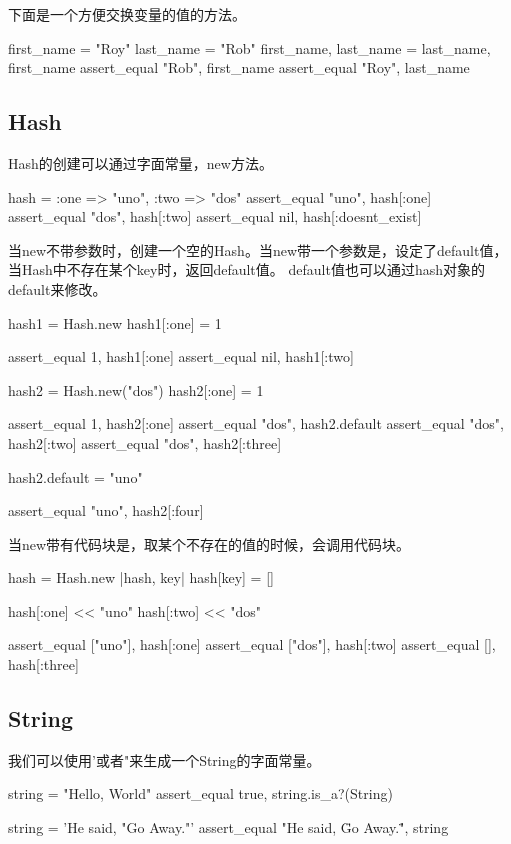 

下面是一个方便交换变量的值的方法。

\begin{Ruby}
	first_name = "Roy"
	last_name = "Rob"
	first_name, last_name = last_name, first_name
	assert_equal "Rob", first_name
	assert_equal "Roy", last_name
\end{Ruby}


\subsection{Hash}
Hash的创建可以通过字面常量，new方法。

\begin{Ruby}
	hash = { :one => "uno", :two => "dos" }
	assert_equal "uno", hash[:one]
	assert_equal "dos", hash[:two]
	assert_equal nil, hash[:doesnt_exist]
\end{Ruby}

当new不带参数时，创建一个空的Hash。当new带一个参数是，设定了default值，当Hash中不存在某个key时，返回default值。
default值也可以通过hash对象的default来修改。

\begin{Ruby}
    hash1 = Hash.new
    hash1[:one] = 1

    assert_equal 1, hash1[:one]
    assert_equal nil, hash1[:two]

    hash2 = Hash.new("dos")
    hash2[:one] = 1

    assert_equal 1, hash2[:one]
    assert_equal "dos", hash2.default
    assert_equal "dos", hash2[:two]
    assert_equal "dos", hash2[:three]

    hash2.default = "uno"

    assert_equal "uno", hash2[:four]
\end{Ruby}

当new带有代码块是，取某个不存在的值的时候，会调用代码块。

\begin{Ruby}
    hash = Hash.new {|hash, key| hash[key] = [] }

    hash[:one] << "uno"
    hash[:two] << "dos"

    assert_equal ["uno"], hash[:one]
    assert_equal ["dos"], hash[:two]
    assert_equal [], hash[:three]
\end{Ruby}


\subsection{String}
我们可以使用'或者"来生成一个String的字面常量。
\begin{Ruby}
    string = "Hello, World"
    assert_equal true, string.is_a?(String)
    
    string = 'He said, "Go Away."'
    assert_equal "He said, \"Go Away.\"", string
    
\end{Ruby}

